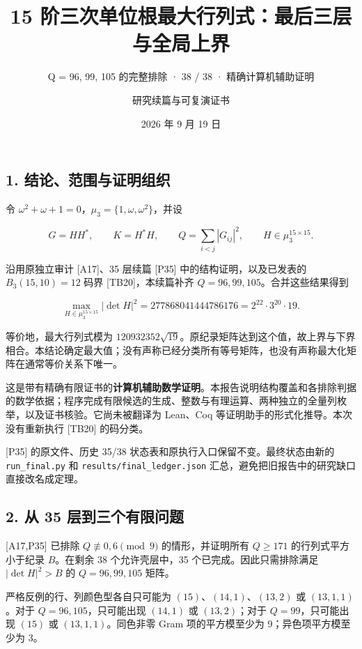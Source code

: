 \documentclass[
  11pt,
  a4paper,
]{article}
\title{15 阶三次单位根最大行列式：最后三层与全局上界}
\subtitle{Q = 96, 99, 105 的完整排除 · 38 / 38 · 精确计算机辅助证明}
\author{研究续篇与可复演证书}
\date{2026 年 9 月 19 日}
\begin{document}
\maketitle

\subsection{1.
结论、范围与证明组织}\label{ux7ed3ux8bbaux8303ux56f4ux4e0eux8bc1ux660eux7ec4ux7ec7}

令 \(\omega^2+\omega+1=0\)，\(\mu_3=\{1,\omega,\omega^2\}\)，并设

\[G=HH^*,\qquad K=H^*H,\qquad Q=\sum_{i<j}|G_{ij}|^2,
\qquad H\in\mu_3^{15\times15}.\]

沿用原独立审计 {[}A17{]}、35 层续篇 {[}P35{]} 中的结构证明，以及已发表的
\(B_3(15,10)=12\) 码界 {[}TB20{]}，本续篇补齐
\(Q=96,99,105\)。合并这些结果得到

\[\boxed{\max_{H\in\mu_3^{15\times15}}|\det H|^2
=277868041444786176=2^{22}\cdot3^{20}\cdot19.}\]

等价地，最大行列式模为
\(120932352\sqrt{19}\)。原纪录矩阵达到这个值，故上界与下界相合。本结论确定最大值；没有声称已经分类所有等号矩阵，也没有声称最大化矩阵在通常等价关系下唯一。

这是带有精确有限证书的\textbf{计算机辅助数学证明}。本报告说明结构覆盖和各排除判据的数学依据；程序完成有限候选的生成、整数与有理运算、两种独立的全量列枚举，以及证书核验。它尚未被翻译为
Lean、Coq 等证明助手的形式化推导。本次没有重新执行 {[}TB20{]} 的码分类。

{[}P35{]} 的原文件、历史 35/38
状态表和原执行入口保留不变。最终状态由新的 \texttt{run\_final.py} 和
\texttt{results/final\_ledger.json}
汇总，避免把旧报告中的研究缺口直接改名成定理。

\subsection{2. 从 35
层到三个有限问题}\label{ux4ece-35-ux5c42ux5230ux4e09ux4e2aux6709ux9650ux95eeux9898}

{[}A17,P35{]} 已排除 \(Q\not\equiv0,6\pmod9\) 的情形，并证明所有
\(Q\ge171\) 的行列式平方小于纪录 \(B\)。在剩余 38 个允许壳层中，35
个已完成。因此只需排除满足 \(|\det H|^2>B\) 的 \(Q=96,99,105\) 矩阵。

严格反例的行、列颜色型各自只可能为 \((15)\)、\((14,1)\)、\((13,2)\) 或
\((13,1,1)\)。对于 \(Q=96,105\)，只可能出现 \((14,1)\) 或
\((13,2)\)；对于 \(Q=99\)，只可能出现 \((15)\) 或 \((13,1,1)\)。同色非零
Gram 项的平方模至少为 9；异色项平方模至少为 3。
\end{document}
